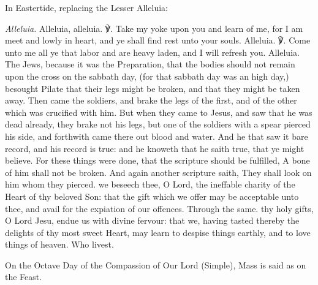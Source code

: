 \begin{rubric}
{In Eastertide, replacing the Lesser Alleluia:}
\end{rubric}\par\noindent
\textit{Alleluia.} Alleluia, alleluia. ℣. Take my yoke upon you and learn of me, for I am meet and lowly in heart, and ye shall find rest unto your souls. Alleluia. ℣. Come unto me all ye that labor and are heavy laden, and I will refresh you. Alleluia.
 The Jews, because it was the Preparation, that the bodies should not remain upon the cross on the sabbath day, (for that sabbath day was an high day,) besought Pilate that their legs might be broken, and that they might be taken away. Then came the soldiers, and brake the legs of the first, and of the other which was crucified with him. But when they came to Jesus, and saw that he was dead already, they brake not his legs, but one of the soldiers with a spear pierced his side, and forthwith came there out blood and water. And he that saw it bare record, and his record is true: and he knoweth that he saith true, that ye might believe. For these things were done, that the scripture should be fulfilled, A bone of him shall not be broken. And again another scripture saith, They shall look on him whom they pierced.
\secret
{} we beseech thee, O Lord, the ineffable charity of the Heart of thy beloved Son: that the gift which we offer may be acceptable unto thee, and avail for the expiation of our offences. Through the same.
\postcommunion
{} thy holy gifts, O Lord Jesu, endue us with divine fervour: that we, having tasted thereby the delights of thy most sweet Heart, may learn to despise things earthly, and to love things of heaven. Who livest.

\begin{rubric}
    On the Octave Day of the Compassion of Our Lord (Simple), Mass is said as on the Feast.
\end{rubric}

